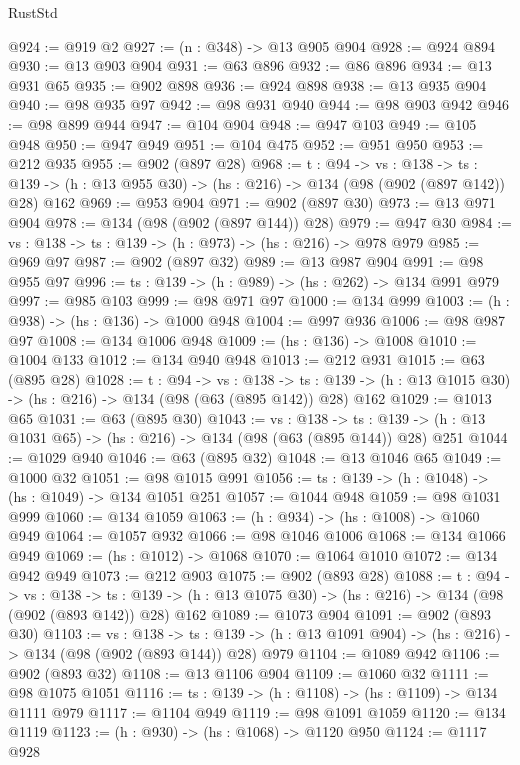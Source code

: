 \begin{lexlean}{RustStd}
\begin{coremodule}
{\begin{coremodule}
{{{{{{{{@924 := @919 @2
@927 := (n : @348) -> @13 @905 @904
@928 := @924 @894
@930 := @13 @903 @904
@931 := @63 @896
@932 := @86 @896
@934 := @13 @931 @65
@935 := @902 @898
@936 := @924 @898
@938 := @13 @935 @904
@940 := @98 @935 @97
@942 := @98 @931 @940
@944 := @98 @903 @942
@946 := @98 @899 @944
@947 := @104 @904
@948 := @947 @103
@949 := @105 @948
@950 := @947 @949
@951 := @104 @475
@952 := @951 @950
@953 := @212 @935
@955 := @902 (@897 @28)
@968 := {t : @94} ->
  {vs : @138} ->
  {ts : @139} -> (h : @13 @955 @30) -> (hs : @216) -> @134 (@98 (@902 (@897 @142)) @28) @162
@969 := @953 @904
@971 := @902 (@897 @30)
@973 := @13 @971 @904
@978 := @134 (@98 (@902 (@897 @144)) @28)
@979 := @947 @30
@984 := {vs : @138} -> {ts : @139} -> (h : @973) -> (hs : @216) -> @978 @979
@985 := @969 @97
@987 := @902 (@897 @32)
@989 := @13 @987 @904
@991 := @98 @955 @97
@996 := {ts : @139} -> (h : @989) -> (hs : @262) -> @134 @991 @979
@997 := @985 @103
@999 := @98 @971 @97
@1000 := @134 @999
@1003 := (h : @938) -> (hs : @136) -> @1000 @948
@1004 := @997 @936
@1006 := @98 @987 @97
@1008 := @134 @1006 @948
@1009 := (hs : @136) -> @1008
@1010 := @1004 @133
@1012 := @134 @940 @948
@1013 := @212 @931
@1015 := @63 (@895 @28)
@1028 := {t : @94} ->
  {vs : @138} ->
  {ts : @139} -> (h : @13 @1015 @30) -> (hs : @216) -> @134 (@98 (@63 (@895 @142)) @28) @162
@1029 := @1013 @65
@1031 := @63 (@895 @30)
@1043 := {vs : @138} ->
  {ts : @139} -> (h : @13 @1031 @65) -> (hs : @216) -> @134 (@98 (@63 (@895 @144)) @28) @251
@1044 := @1029 @940
@1046 := @63 (@895 @32)
@1048 := @13 @1046 @65
@1049 := @1000 @32
@1051 := @98 @1015 @991
@1056 := {ts : @139} -> (h : @1048) -> (hs : @1049) -> @134 @1051 @251
@1057 := @1044 @948
@1059 := @98 @1031 @999
@1060 := @134 @1059
@1063 := (h : @934) -> (hs : @1008) -> @1060 @949
@1064 := @1057 @932
@1066 := @98 @1046 @1006
@1068 := @134 @1066 @949
@1069 := (hs : @1012) -> @1068
@1070 := @1064 @1010
@1072 := @134 @942 @949
@1073 := @212 @903
@1075 := @902 (@893 @28)
@1088 := {t : @94} ->
  {vs : @138} ->
  {ts : @139} -> (h : @13 @1075 @30) -> (hs : @216) -> @134 (@98 (@902 (@893 @142)) @28) @162
@1089 := @1073 @904
@1091 := @902 (@893 @30)
@1103 := {vs : @138} ->
  {ts : @139} -> (h : @13 @1091 @904) -> (hs : @216) -> @134 (@98 (@902 (@893 @144)) @28) @979
@1104 := @1089 @942
@1106 := @902 (@893 @32)
@1108 := @13 @1106 @904
@1109 := @1060 @32
@1111 := @98 @1075 @1051
@1116 := {ts : @139} -> (h : @1108) -> (hs : @1109) -> @134 @1111 @979
@1117 := @1104 @949
@1119 := @98 @1091 @1059
@1120 := @134 @1119
@1123 := (h : @930) -> (hs : @1068) -> @1120 @950
@1124 := @1117 @928
}}}}}}}}
\end{coremodule}}
\end{coremodule}
\end{lexlean}
